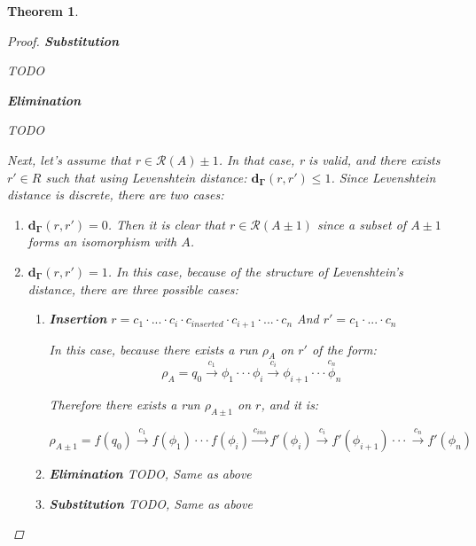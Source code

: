 \documentclass{article}
\newcommand{\lra}{\longrightarrow}
\newtheorem{theorem}{Theorem}
\begin{document}
\begin{theorem}
\begin{proof}
\textbf{Substitution}

TODO

        \textbf{Elimination}

        TODO

        Next, let's assume that $r \in \mathcal{R}(A) \pm 1$. In that case, r is valid, and there exists $r' \in R$ such that using Levenshtein distance: $\mathbf{d_\Gamma}(r, r') \leq 1$. Since Levenshtein distance is discrete, there are two cases:
        \begin{enumerate}
            \item $\mathbf{d_\Gamma}(r, r') = 0$. Then it is clear that $r \in \mathcal{R}(A \pm 1)$ since a subset of $A \pm 1$ forms an isomorphism with $A$.
            \item $\mathbf{d_\Gamma}(r, r') = 1$. In this case, because of the structure of Levenshtein's distance, there are three possible cases:
                \begin{enumerate}
                    \item \textbf{Insertion} $ r = c_1 \cdot ... \cdot c_i \cdot c_{inserted} \cdot c_{i + 1} \cdot ... \cdot c_n$  And $r' = c_1 \cdot ... \cdot c_n$

                        In this case, because there exists a run $\rho_A$ on $r'$ of the form:
                        \begin{equation*}
                            \rho_A = q_0 \overset{c_1}{\lra} \phi_1 \cdot\cdot\cdot \phi_i \overset{c_i}{\lra} \phi_{i + 1}  \cdot \cdot \cdot \overset{c_n} \phi_n
                        \end{equation*}

                        Therefore there exists a run $\rho_{A\pm1}$ on $r$, and it is:

                        \begin{equation*}
                            \rho_{A\pm 1} = f(q_0) \overset{c_1}{\lra} f(\phi_1) \cdot\cdot\cdot f(\phi_i) \overset{c_{ins}}{\lra} f'(\phi_i) \overset{c_i}{\lra} f'(\phi_{i + 1})  \cdot \cdot \cdot \overset{c_n}{\lra} f'(\phi_n)
                        \end{equation*}
                    \item \textbf{Elimination } TODO, Same as above
                    \item \textbf{Substitution} TODO, Same as above
                \end{enumerate}
        \end{enumerate}
    \end{proof}
\end{theorem}
\end{document}
